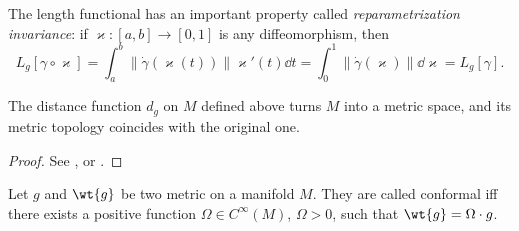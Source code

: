 The length functional has an important property called \emph{reparametrization invariance}: if $\varkappa:[a,b]\to[0,1]$ is any diffeomorphism, then 
\[L_g[\gamma\circ\varkappa]=\int_a^b  \lVert\dot\gamma(\varkappa(t))\rVert \varkappa' (t)\dd t=\int_0^1 \lVert\dot\gamma(\varkappa)\rVert \dd \varkappa = L_g[\gamma].\]


\begin{thm}
    The distance function $d_g$ on $M$ defined above turns $M$ into a metric space, and its metric topology coincides with the original one.
\end{thm}
\begin{proof}
    See \cite[Thm. 13.29]{Lee}, \cite[Lem. 6.2]{LieRiem} or \cite[Lem. 1.4.1]{Jost}.
\end{proof}


\begin{defn}
    Let $g$ and $\wt{g}$ be two metric on a manifold $M$. They are called conformal iff there exists a positive function $\Omega\in C^\infty(M)$, $\Omega>0$, such that $\wt{g}=\Omega\cdot g$.
\end{defn}

